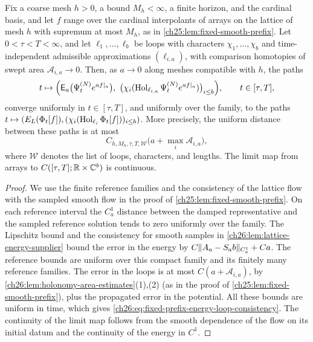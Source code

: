 \begin{lemma}\label{ch26:lem:fixed-prefix-energy-paths}
Fix a coarse mesh $h>0$, a bound $M_h<\infty$, a finite horizon, and the cardinal basis, and let $f$ range over the cardinal interpolants of arrays on the lattice of mesh $h$ with supremum at most $M_h$, as in \cref{ch25:lem:fixed-smooth-prefix}. Let $0<\tau<T<\infty$, and let $\ell_1,\dots,\ell_b$ be loops with characters $\chi_1,\dots,\chi_b$ and time-independent admissible approximations $(\ell_{i,a})$, with comparison homotopies of swept area $\mathcal A_{i,a}\to0$. Then, as $a\to0$ along meshes compatible with $h$, the paths
\[
 t\mapsto\Bigl(\mathsf E_a\bigl(\Flowlat N_te^{af|_a}\bigr),\ \bigl(\chi_i(\Hol_{\ell_{i,a}}\Flowlat N_te^{af|_a})\bigr)_{i\le b}\Bigr),\qquad t\in[\tau,T],
\]
converge uniformly in $t\in[\tau,T]$, and uniformly over the family, to the paths $t\mapsto(E_L(\Phi_t[f]),(\chi_i(\operatorname{Hol}_{\ell_i}\Phi_t[f]))_{i\le b})$. More precisely, the uniform distance between these paths is at most
\begin{equation}\label{ch26:eq:fixed-prefix-energy-loop-consistency}
 C_{h,M_h,\tau,T,\mathscr W}\bigl(a+\max_i\mathcal A_{i,a}\bigr),
\end{equation}
where $\mathscr W$ denotes the list of loops, characters, and lengths. The limit map from arrays to $C([\tau,T];\mathbb R\times\mathbb C^b)$ is continuous.
\end{lemma}

\begin{proof}
We use the finite reference families and the consistency of the lattice flow with the sampled smooth flow in the proof of \cref{ch25:lem:fixed-smooth-prefix}. On each reference interval the $C_a^1$ distance between the damped representative and the sampled reference solution tends to zero uniformly over the family. The Lipschitz bound and the consistency for smooth samples in \cref{ch26:lem:lattice-energy-supplier} bound the error in the energy by $C\lVert A_a-S_ab\rVert_{C_a^1}+Ca$. The reference bounds are uniform over this compact family and its finitely many reference families. The error in the loops is at most $C(a+\mathcal A_{i,a})$, by \cref{ch26:lem:holonomy-area-estimates}(1),(2) (as in the proof of \cref{ch25:lem:fixed-smooth-prefix}), plus the propagated error in the potential. All these bounds are uniform in time, which gives \eqref{ch26:eq:fixed-prefix-energy-loop-consistency}. The continuity of the limit map follows from the smooth dependence of the flow on its initial datum and the continuity of the energy in $C^1$.
\end{proof}


